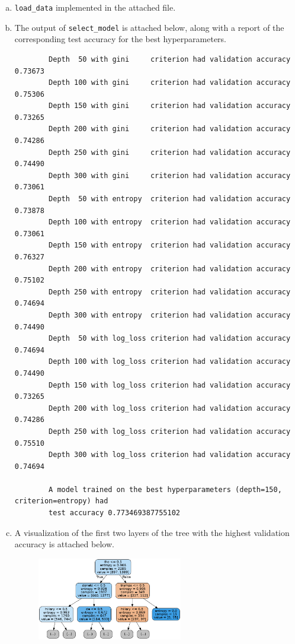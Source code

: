 \documentclass{article}
\begin{document}
\begin{enumerate}[(a)]
    \item \texttt{load\_data} implemented in the attached file. 
    \item The output of \texttt{select\_model} is attached below, along with a report of the corresponding test accuracy for the best hyperparameters.

    \begin{verbatim}
        Depth  50 with gini     criterion had validation accuracy 0.73673 
        Depth 100 with gini     criterion had validation accuracy 0.75306 
        Depth 150 with gini     criterion had validation accuracy 0.73265 
        Depth 200 with gini     criterion had validation accuracy 0.74286 
        Depth 250 with gini     criterion had validation accuracy 0.74490 
        Depth 300 with gini     criterion had validation accuracy 0.73061 
        Depth  50 with entropy  criterion had validation accuracy 0.73878 
        Depth 100 with entropy  criterion had validation accuracy 0.73061 
        Depth 150 with entropy  criterion had validation accuracy 0.76327 
        Depth 200 with entropy  criterion had validation accuracy 0.75102 
        Depth 250 with entropy  criterion had validation accuracy 0.74694 
        Depth 300 with entropy  criterion had validation accuracy 0.74490 
        Depth  50 with log_loss criterion had validation accuracy 0.74694 
        Depth 100 with log_loss criterion had validation accuracy 0.74490 
        Depth 150 with log_loss criterion had validation accuracy 0.73265 
        Depth 200 with log_loss criterion had validation accuracy 0.74286 
        Depth 250 with log_loss criterion had validation accuracy 0.75510 
        Depth 300 with log_loss criterion had validation accuracy 0.74694 

        A model trained on the best hyperparameters (depth=150, criterion=entropy) had 
        test accuracy 0.773469387755102
    \end{verbatim}

    \item A visualization of the first two layers of the tree with the highest validation accuracy is attached below. 
    
    \begin{figure}[H]
        \centering
        \includegraphics[width=0.6\textwidth]{../q2/figures/best_tree.png}
        \label{fig:q2c}
    \end{figure}


\end{enumerate}
\end{document}
